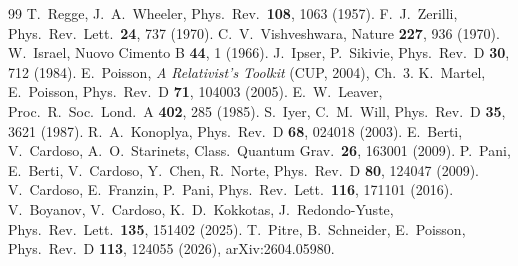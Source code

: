 \documentclass[10pt,a4paper]{article}
\begin{document}
\vspace{-2mm}
{\footnotesize
\begin{thebibliography}{99}\setlength{\itemsep}{0pt}
 T.~Regge, J.~A.~Wheeler, Phys.\ Rev.\ \textbf{108}, 1063 (1957).
 F.~J.~Zerilli, Phys.\ Rev.\ Lett.\ \textbf{24}, 737 (1970).
 C.~V.~Vishveshwara, Nature \textbf{227}, 936 (1970).
 W.~Israel, Nuovo Cimento B \textbf{44}, 1 (1966).
 J.~Ipser, P.~Sikivie, Phys.\ Rev.\ D \textbf{30}, 712 (1984).
 E.~Poisson, \emph{A Relativist's Toolkit} (CUP, 2004), Ch.~3.
 K.~Martel, E.~Poisson, Phys.\ Rev.\ D \textbf{71}, 104003 (2005).
 E.~W.~Leaver, Proc.\ R.\ Soc.\ Lond.\ A \textbf{402}, 285 (1985).
 S.~Iyer, C.~M.~Will, Phys.\ Rev.\ D \textbf{35}, 3621 (1987).
 R.~A.~Konoplya, Phys.\ Rev.\ D \textbf{68}, 024018 (2003).
 E.~Berti, V.~Cardoso, A.~O.~Starinets, Class.\ Quantum Grav.\ \textbf{26}, 163001 (2009).
 P.~Pani, E.~Berti, V.~Cardoso, Y.~Chen, R.~Norte, Phys.\ Rev.\ D \textbf{80}, 124047 (2009).
 V.~Cardoso, E.~Franzin, P.~Pani, Phys.\ Rev.\ Lett.\ \textbf{116}, 171101 (2016).
 V.~Boyanov, V.~Cardoso, K.~D.~Kokkotas, J.~Redondo-Yuste, Phys.\ Rev.\ Lett.\ \textbf{135}, 151402 (2025).
 T.~Pitre, B.~Schneider, E.~Poisson, Phys.\ Rev.\ D \textbf{113}, 124055 (2026), arXiv:2604.05980.
\end{thebibliography}}
\end{document}
